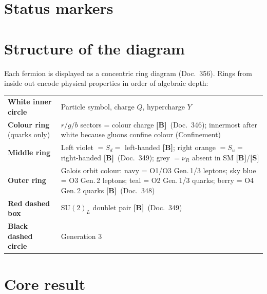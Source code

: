 \providecommand{\BM}{\textbf{[B]}}
\providecommand{\KM}{\textbf{[K]}}
\providecommand{\SM}{\textbf{[S]}}
\providecommand{\XM}{\textbf{[X]}}

{}

\section*{Status markers}


\section*{Structure of the diagram}

Each fermion is displayed as a concentric ring diagram (Doc.~356).
Rings from inside out encode physical properties in order of algebraic depth:

\begin{center}
\begin{tabular}{@{}lp{10cm}@{}}
\textbf{White inner circle} & Particle symbol, charge $Q$, hypercharge $Y$ \\[3pt]
\textbf{Colour ring} (quarks only) & $r/g/b$ sectors = colour charge \BM\ (Doc.~346);
  innermost after white because gluons confine colour (Confinement) \\[3pt]
\textbf{Middle ring} & Left violet $= S_d =$ left-handed \BM;
  right orange $= S_u =$ right-handed \BM\ (Doc.~349);
  grey $= \nu_R$ absent in SM \BM/\SM \\[3pt]
\textbf{Outer ring} & Galois orbit colour: navy = O1/O3 Gen.\,1/3 leptons;
  sky blue = O3 Gen.\,2 leptons; teal = O2 Gen.\,1/3 quarks;
  berry = O4 Gen.\,2 quarks \BM\ (Doc.~348) \\[3pt]
\textbf{Red dashed box} & SU$(2)_L$ doublet pair \BM\ (Doc.~349) \\[3pt]
\textbf{Black dashed circle} & Generation 3 \\
\end{tabular}
\end{center}

\section*{Core result}

